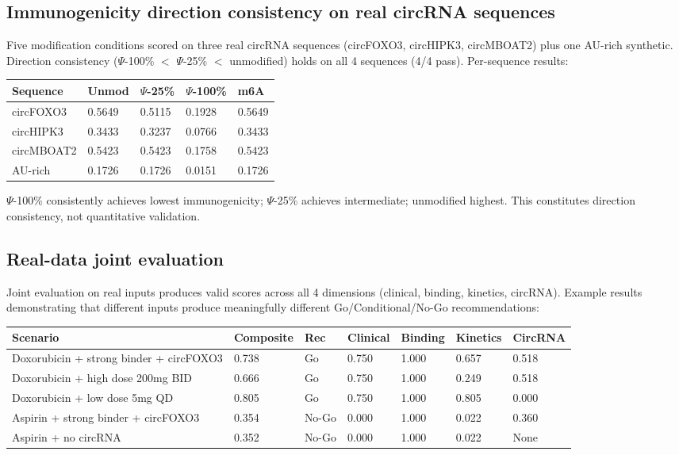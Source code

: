 \subsection*{Immunogenicity direction consistency on real circRNA sequences}

Five modification conditions scored on three real circRNA sequences (circFOXO3, circHIPK3, circMBOAT2) plus one AU-rich synthetic. Direction consistency ($\Psi$-100\% $<$ $\Psi$-25\% $<$ unmodified) holds on all 4 sequences (4/4 pass). Per-sequence results:

\begin{tabular}{lllll}
\toprule
\textbf{Sequence} & \textbf{Unmod} & \textbf{$\Psi$-25\%} & \textbf{$\Psi$-100\%} & \textbf{m6A} \\
\midrule
circFOXO3 & 0.5649 & 0.5115 & 0.1928 & 0.5649 \\
circHIPK3 & 0.3433 & 0.3237 & 0.0766 & 0.3433 \\
circMBOAT2 & 0.5423 & 0.5423 & 0.1758 & 0.5423 \\
AU-rich & 0.1726 & 0.1726 & 0.0151 & 0.1726 \\
\bottomrule
\end{tabular}

$\Psi$-100\% consistently achieves lowest immunogenicity; $\Psi$-25\% achieves intermediate; unmodified highest. This constitutes direction consistency, not quantitative validation.

\subsection*{Real-data joint evaluation}

Joint evaluation on real inputs produces valid scores across all 4 dimensions (clinical, binding, kinetics, circRNA). Example results demonstrating that different inputs produce meaningfully different Go/Conditional/No-Go recommendations:

\begin{tabular}{lllllll}
\toprule
\textbf{Scenario} & \textbf{Composite} & \textbf{Rec} & \textbf{Clinical} & \textbf{Binding} & \textbf{Kinetics} & \textbf{CircRNA} \\
\midrule
Doxorubicin + strong binder + circFOXO3 & 0.738 & Go & 0.750 & 1.000 & 0.657 & 0.518 \\
Doxorubicin + high dose 200mg BID & 0.666 & Go & 0.750 & 1.000 & 0.249 & 0.518 \\
Doxorubicin + low dose 5mg QD & 0.805 & Go & 0.750 & 1.000 & 0.805 & 0.000 \\
Aspirin + strong binder + circFOXO3 & 0.354 & No-Go & 0.000 & 1.000 & 0.022 & 0.360 \\
Aspirin + no circRNA & 0.352 & No-Go & 0.000 & 1.000 & 0.022 & None \\
\bottomrule
\end{tabular}

